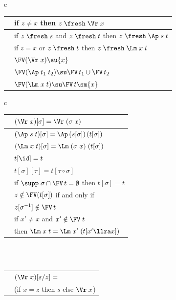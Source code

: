 \begin{figure}
{\begin{tabular}{c}
	\begin{tabular}{|c|l|}	
	\hline 
	\textrm{\FrVr} & 
	if $z \not=x$ then $z\;\fresh\;\Vr\;x$
	\\\hline
	\textrm{\FrAp} &
	if $z\;\fresh\;s$ and $z\;\fresh\;t$ then $z\;\fresh\;\Ap\;s\;t$
	\\\hline
	\textrm{\FrLm}  &
	if $z = x$ or $z\;\fresh\;t$ then $ z\;\fresh\;\Lm\;x\;t$
	\\\hline
	\textrm{\FvVr} & 
	$\FV(\Vr\;x) \su \{x\}$
	\\\hline
	\textrm{\FvAp} &
	$\FV(\Ap\;t_1\;t_2) \su \FV\,t_1 \cup \FV\,t_2$  
	\\\hline
	\textrm{\FvLm}  &
	$\FV(\Lm\;x\;t) \su \FV\,t \sm \{x\}$ 
	\\\hline
\end{tabular}
\end{tabular} 
\hspace*{-4.4ex}
\begin{tabular}{c}
	\begin{tabular}{|c|l|}	
		\hline
		\textrm{\PmVr} 
		&
		$(\Vr\;x)[\sigma] = \Vr\;(\sigma\;x)$ 
		\\\hline
		\textrm{\PmAp} 
		&
		$(\Ap\;s\;t)[\sigma] =    
		\Ap\,(s[\sigma])\,(t[\sigma])$
		\\\hline
		\textrm{\PmLm} 
		&
		$(\Lm\;x\;t)[\sigma] = 
		\Lm\;(\sigma\;x)\;(t[\sigma])$
		\\\hline
		\textrm{\PmId}  
		&
		$t[\id] = t$
		\\\hline	
		\textrm{\PmCp}  & $t[\sigma][\tau] = t[\tau \circ \sigma]$
		\\\hline
		\textrm{\PmFv} & 
		if $\supp\;\sigma \cap \FV\,t = \emptyset$ then $t[\sigma] = t$
		\\\hline
		\textrm{\FvPm}  & 
		$z \notin \FV(t[\sigma])$ if and only if  
		\\&
		$z[\sigma^{-1}] \notin \FV\,t$
		\\\hline 
		\textrm{\PmBvr} 
		&
		if $x' \not= x$ and 
		$x' \notin \FV\;t$ 
		\\&then 
		$\Lm\;x\;t = \Lm\;x'\;(t[x'  \llra x])$
		\\\hline
	\end{tabular}
\\ \\ \vspace*{-0.5ex}
\begin{tabular}{|c|l|}	
	\hline
	\textrm{\SbVr}
	& 
	$(\Vr\;x)[s / z] = $ 
	\\&
	(if $x = z$ then $s$ else $\Vr\;x$)  

\end{tabular}
\end{tabular}}
\end{figure}
